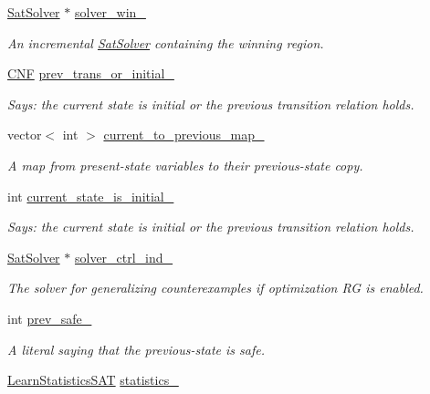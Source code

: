 \begin{DoxyCompactItemize}
\hyperlink{classSatSolver}{Sat\-Solver} $\ast$ \hyperlink{classCounterGenSAT_a4c209741406375df9ba19b830ca4d6f9}{solver\-\_\-win\-\_\-}
\begin{DoxyCompactList}\small\item\em An incremental \hyperlink{classSatSolver}{Sat\-Solver} containing the winning region. \end{DoxyCompactList}\item 
\hyperlink{classCNF}{C\-N\-F} \hyperlink{classCounterGenSAT_a526507443918740c5ac2ae24886d1017}{prev\-\_\-trans\-\_\-or\-\_\-initial\-\_\-}
\begin{DoxyCompactList}\small\item\em Says\-: the current state is initial or the previous transition relation holds. \end{DoxyCompactList}\item 
vector$<$ int $>$ \hyperlink{classCounterGenSAT_acdb06a8e09c3c017dbda36d37fab5998}{current\-\_\-to\-\_\-previous\-\_\-map\-\_\-}
\begin{DoxyCompactList}\small\item\em A map from present-\/state variables to their previous-\/state copy. \end{DoxyCompactList}\item 
int \hyperlink{classCounterGenSAT_a578a95e6b9eb1b1b19419c0acb3248fa}{current\-\_\-state\-\_\-is\-\_\-initial\-\_\-}
\begin{DoxyCompactList}\small\item\em Says\-: the current state is initial or the previous transition relation holds. \end{DoxyCompactList}\item 
\hyperlink{classSatSolver}{Sat\-Solver} $\ast$ \hyperlink{classCounterGenSAT_a33c1b5637bdd766a7d2b8ff2e3147eca}{solver\-\_\-ctrl\-\_\-ind\-\_\-}
\begin{DoxyCompactList}\small\item\em The solver for generalizing counterexamples if optimization R\-G is enabled. \end{DoxyCompactList}\item 
int \hyperlink{classCounterGenSAT_a6b1ebfdef38c7463a2594ace7bd72a8d}{prev\-\_\-safe\-\_\-}
\begin{DoxyCompactList}\small\item\em A literal saying that the previous-\/state is safe. \end{DoxyCompactList}\item 
\hyperlink{classLearnStatisticsSAT}{Learn\-Statistics\-S\-A\-T} \hyperlink{classCounterGenSAT_a0e7c47014a35bac7a6de0a61ee8d2c22}{statistics\-\_\-}

\end{DoxyCompactItemize}
